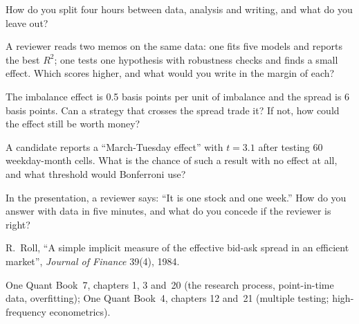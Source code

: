 \begin{interviewq}\label{iq:iv:research-case-studies-and-take-homes:8}
How do you split four hours between data, analysis and writing, and what do you leave out?
\end{interviewq}

\begin{interviewq}\label{iq:iv:research-case-studies-and-take-homes:9}
A reviewer reads two memos on the same data: one fits five models and reports the best $R^2$; one tests one hypothesis with
robustness checks and finds a small effect. Which scores higher, and what would you write in the margin of each?
\end{interviewq}

\begin{interviewq}\label{iq:iv:research-case-studies-and-take-homes:10}
The imbalance effect is 0.5 basis points per unit of imbalance and the spread is 6 basis points. Can a strategy that crosses
the spread trade it? If not, how could the effect still be worth money?
\end{interviewq}

\begin{interviewq}\label{iq:iv:research-case-studies-and-take-homes:11}
A candidate reports a ``March-Tuesday effect'' with $t = 3.1$ after testing 60 weekday-month cells. What is the chance of such a
result with no effect at all, and what threshold would Bonferroni use?
\end{interviewq}

\begin{interviewq}\label{iq:iv:research-case-studies-and-take-homes:12}
In the presentation, a reviewer says: ``It is one stock and one week.'' How do you answer with data in five minutes, and what do
you concede if the reviewer is right?
\end{interviewq}

\begin{omsources}
\item R.~Roll, ``A simple implicit measure of the effective bid-ask spread in an efficient market'', \emph{Journal of Finance}
39(4), 1984.
\item One Quant Book~7, chapters 1, 3 and~20 (the research process, point-in-time data, overfitting); One Quant Book~4, chapters
12 and~21 (multiple testing; high-frequency econometrics).
\end{omsources}
